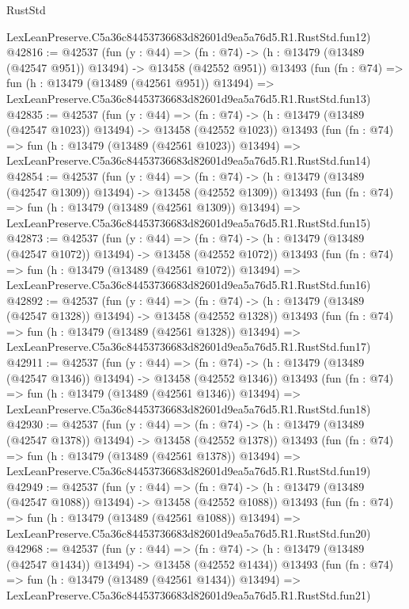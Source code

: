 \begin{lexlean}{RustStd}
\begin{coremodule}
    LexLeanPreserve.C5a36c84453736683d82601d9ea5a76d5.R1.RustStd.fun12)
@42816 := @42537
    (fun (y : @44) =>
    (fn : @74) -> (h : @13479 (@13489 (@42547 @951)) @13494) -> @13458 (@42552 @951))
    @13493
    (fun (fn : @74) =>
    fun (h : @13479 (@13489 (@42561 @951)) @13494) =>
    LexLeanPreserve.C5a36c84453736683d82601d9ea5a76d5.R1.RustStd.fun13)
@42835 := @42537
    (fun (y : @44) =>
    (fn : @74) -> (h : @13479 (@13489 (@42547 @1023)) @13494) -> @13458 (@42552 @1023))
    @13493
    (fun (fn : @74) =>
    fun (h : @13479 (@13489 (@42561 @1023)) @13494) =>
    LexLeanPreserve.C5a36c84453736683d82601d9ea5a76d5.R1.RustStd.fun14)
@42854 := @42537
    (fun (y : @44) =>
    (fn : @74) -> (h : @13479 (@13489 (@42547 @1309)) @13494) -> @13458 (@42552 @1309))
    @13493
    (fun (fn : @74) =>
    fun (h : @13479 (@13489 (@42561 @1309)) @13494) =>
    LexLeanPreserve.C5a36c84453736683d82601d9ea5a76d5.R1.RustStd.fun15)
@42873 := @42537
    (fun (y : @44) =>
    (fn : @74) -> (h : @13479 (@13489 (@42547 @1072)) @13494) -> @13458 (@42552 @1072))
    @13493
    (fun (fn : @74) =>
    fun (h : @13479 (@13489 (@42561 @1072)) @13494) =>
    LexLeanPreserve.C5a36c84453736683d82601d9ea5a76d5.R1.RustStd.fun16)
@42892 := @42537
    (fun (y : @44) =>
    (fn : @74) -> (h : @13479 (@13489 (@42547 @1328)) @13494) -> @13458 (@42552 @1328))
    @13493
    (fun (fn : @74) =>
    fun (h : @13479 (@13489 (@42561 @1328)) @13494) =>
    LexLeanPreserve.C5a36c84453736683d82601d9ea5a76d5.R1.RustStd.fun17)
@42911 := @42537
    (fun (y : @44) =>
    (fn : @74) -> (h : @13479 (@13489 (@42547 @1346)) @13494) -> @13458 (@42552 @1346))
    @13493
    (fun (fn : @74) =>
    fun (h : @13479 (@13489 (@42561 @1346)) @13494) =>
    LexLeanPreserve.C5a36c84453736683d82601d9ea5a76d5.R1.RustStd.fun18)
@42930 := @42537
    (fun (y : @44) =>
    (fn : @74) -> (h : @13479 (@13489 (@42547 @1378)) @13494) -> @13458 (@42552 @1378))
    @13493
    (fun (fn : @74) =>
    fun (h : @13479 (@13489 (@42561 @1378)) @13494) =>
    LexLeanPreserve.C5a36c84453736683d82601d9ea5a76d5.R1.RustStd.fun19)
@42949 := @42537
    (fun (y : @44) =>
    (fn : @74) -> (h : @13479 (@13489 (@42547 @1088)) @13494) -> @13458 (@42552 @1088))
    @13493
    (fun (fn : @74) =>
    fun (h : @13479 (@13489 (@42561 @1088)) @13494) =>
    LexLeanPreserve.C5a36c84453736683d82601d9ea5a76d5.R1.RustStd.fun20)
@42968 := @42537
    (fun (y : @44) =>
    (fn : @74) -> (h : @13479 (@13489 (@42547 @1434)) @13494) -> @13458 (@42552 @1434))
    @13493
    (fun (fn : @74) =>
    fun (h : @13479 (@13489 (@42561 @1434)) @13494) =>
    LexLeanPreserve.C5a36c84453736683d82601d9ea5a76d5.R1.RustStd.fun21)

\end{coremodule}
\end{lexlean}
